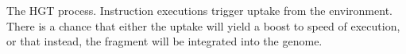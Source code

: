 The HGT process. Instruction executions trigger uptake from the environment. There is a chance that either the uptake will yield a boost to speed of execution, or that instead, the fragment will be integrated into the genome.